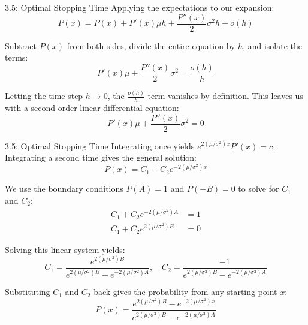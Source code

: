 \documentclass{beamer}
\begin{document}
	\begin{frame}{3.5: Optimal Stopping Time}
		Applying the expectations to our expansion:
		$$P(x) = P(x) + P'(x)\mu h + \frac{P''(x)}{2}\sigma^2h + o(h)$$
		
		\vspace{0.3cm}
		Subtract $P(x)$ from both sides, divide the entire equation by $h$, and isolate the terms:
		$$P'(x)\mu + \frac{P''(x)}{2}\sigma^2 = \frac{o(h)}{h}$$
		
		\vspace{0.3cm}
		Letting the time step $h \to 0$, the $\frac{o(h)}{h}$ term vanishes by definition. This leaves us with a second-order linear differential equation:
		$$P'(x)\mu + \frac{P''(x)}{2}\sigma^2 = 0$$
	\end{frame}
	
	\begin{frame}{3.5: Optimal Stopping Time}
		Integrating once yields $e^{2(\mu/\sigma^2) x} P'(x) = c_1$. 
		Integrating a second time gives the general solution:
		$$P(x) = C_1 + C_2 e^{-2(\mu/\sigma^2) x}$$
		
		We use the boundary conditions $P(A) = 1$ and $P(-B) = 0$ to solve for $C_1$ and $C_2$:
		\begin{align*}
			C_1 + C_2 e^{-2(\mu/\sigma^2) A} &= 1 \\
			C_1 + C_2 e^{2(\mu/\sigma^2) B} &= 0
		\end{align*}
		
		\vspace{0.2cm}
		Solving this linear system yields:
		$$C_1 = \frac{e^{2(\mu/\sigma^2) B}}{e^{2(\mu/\sigma^2) B} - e^{-2(\mu/\sigma^2) A}}, \quad C_2 = \frac{-1}{e^{2(\mu/\sigma^2) B} - e^{-2(\mu/\sigma^2) A}}$$
		
		\vspace{0.2cm}
		Substituting $C_1$ and $C_2$ back gives the probability from any starting point $x$:
		$$P(x) = \frac{e^{2(\mu/\sigma^2) B} - e^{-2(\mu/\sigma^2) x}}{e^{2(\mu/\sigma^2) B} - e^{-2(\mu/\sigma^2) A}}$$
	\end{frame}
	
\end{document}
